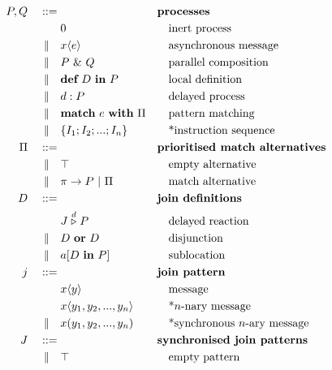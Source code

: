 \begin{figure}
\begin{align*}
P,Q\quad::={}&             && \textbf{processes} \\
          & 0              && \quad\textrm{inert process} \\
 \alt\quad& x\langle e \rangle
                           && \quad\textrm{asynchronous message} \\
 \alt\quad& P~\&~Q         && \quad\textrm{parallel composition} \\
 \alt\quad& \textbf{def}~D~\textbf{in}~P
                           && \quad\textrm{local definition} \\
 \alt\quad& d : P          && \quad\textrm{delayed process} \\
 \alt\quad& \textbf{match}~e~\textbf{with}~\Pi
                           && \quad\textrm{pattern matching} \\
 \alt\quad& \{ I_1; I_2; ...; I_n \}
                           && \quad\textrm{*instruction sequence} \\
\Pi\quad ::={}&            && \textbf{prioritised match alternatives} \\
 \alt\quad& \top           && \quad\textrm{empty alternative} \\
 \alt\quad& \pi \rightarrow P ~|~ \Pi
                           && \quad\textrm{match alternative} \\
D\quad ::={}&              && \textbf{join definitions} \\
         & J \stackrel{d}{\triangleright} P
                           && \quad\textrm{delayed reaction} \\
\alt\quad& D~\textbf{or}~D && \quad\textrm{disjunction} \\
\alt\quad& a[D~\textbf{in}~P] && \quad\textrm{sublocation} \\
j\quad ::={}&             && \textbf{join pattern} \\
            & x\langle y \rangle
                           && \quad\textrm{message} \\
            & x\langle y_1, y_2, ..., y_n \rangle
                           && \quad\textrm{*$n$-nary message} \\
\alt\quad& x(y_1, y_2, ..., y_n)
                           && \quad\textrm{*synchronous $n$-ary message} \\
J\quad ::={}&              && \textbf{synchronised join patterns}\\
\alt\quad& \top               && \quad\textrm{empty pattern}\\

\end{align*}
\end{figure}
